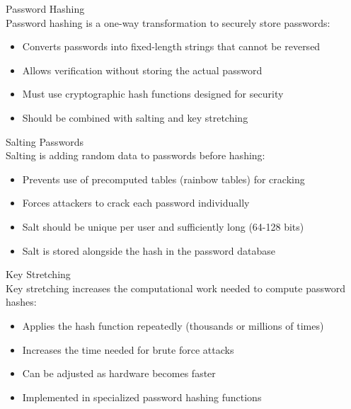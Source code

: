 \begin{definition}{Password Hashing}\\
Password hashing is a one-way transformation to securely store passwords:
\begin{itemize}
    \item Converts passwords into fixed-length strings that cannot be reversed
    \item Allows verification without storing the actual password
    \item Must use cryptographic hash functions designed for security
    \item Should be combined with salting and key stretching
\end{itemize}
\end{definition}

\begin{concept}{Salting Passwords}\\
Salting is adding random data to passwords before hashing:
\begin{itemize}
    \item Prevents use of precomputed tables (rainbow tables) for cracking
    \item Forces attackers to crack each password individually
    \item Salt should be unique per user and sufficiently long (64-128 bits)
    \item Salt is stored alongside the hash in the password database
\end{itemize}
\end{concept}

\begin{concept}{Key Stretching}\\
Key stretching increases the computational work needed to compute password hashes:
\begin{itemize}
    \item Applies the hash function repeatedly (thousands or millions of times)
    \item Increases the time needed for brute force attacks
    \item Can be adjusted as hardware becomes faster
    \item Implemented in specialized password hashing functions
\end{itemize}
\end{concept}

